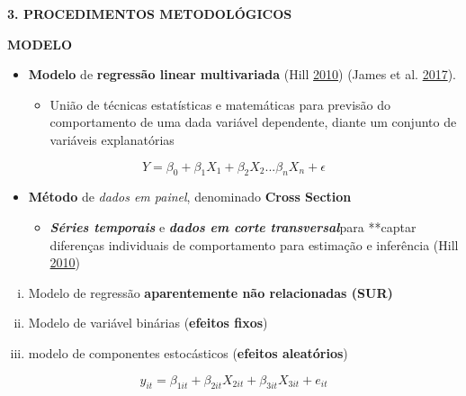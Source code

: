 \documentclass[ignorenonframetext,aspectratio=169,ignorenonframetext]{beamer}
\providecommand{\tightlist}{%
  \setlength{\itemsep}{0pt}\setlength{\parskip}{0pt}}
\begin{document}
\begin{frame}{\textbf{3. PROCEDIMENTOS METODOLÓGICOS}}
\protect\hypertarget{procedimentos-metodoluxf3gicos-5}{}

\textbf{MODELO}

\begin{itemize}
\tightlist
\item
  \textbf{Modelo} de \textbf{regressão linear multivariada} (Hill
  \protect\hyperlink{ref-hill:2010}{2010}) (James et al.
  \protect\hyperlink{ref-gareth:2017}{2017}).

  \begin{itemize}
  \tightlist
  \item
    União de técnicas estatísticas e matemáticas para previsão do
    comportamento de uma dada variável dependente, diante um conjunto de
    variáveis explanatórias
  \end{itemize}
\end{itemize}

\[
Y = \beta_0 + \beta_1X_1 + \beta_2X_2...\beta_nX_n + \epsilon
\]

\begin{itemize}
\tightlist
\item
  \textbf{Método} de \emph{dados em painel}, denominado \textbf{Cross
  Section}

  \begin{itemize}
  \tightlist
  \item
    \textbf{\emph{Séries temporais}} e \textbf{\emph{dados em corte
    transversal}}para **captar diferenças individuais de comportamento
    para estimação e inferência (Hill
    \protect\hyperlink{ref-hill:2010}{2010})
  \end{itemize}
\end{itemize}

\begin{enumerate}
[i)]
\tightlist
\item
  Modelo de regressão \textbf{aparentemente não relacionadas (SUR)}
\item
  Modelo de variável binárias (\textbf{efeitos fixos})
\item
  modelo de componentes estocásticos (\textbf{efeitos aleatórios})
\end{enumerate}

\[
y_{it} = \beta_{1it} + \beta_{2it}X_{2it} + \beta_{3it}X_{3it} + e_{it}
\]

\end{frame}
\end{document}
